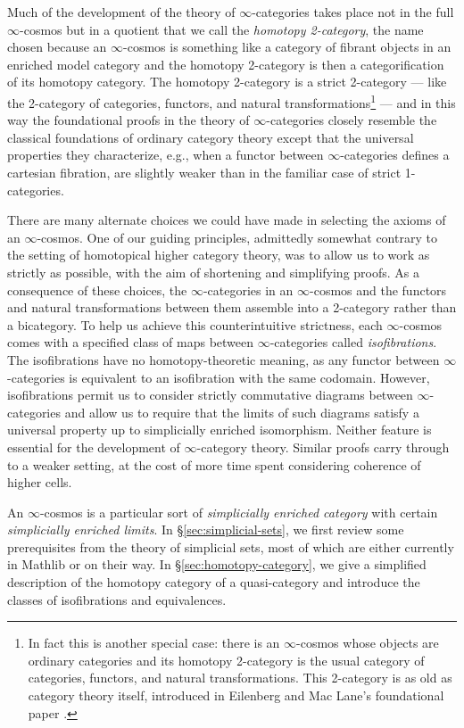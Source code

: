  Much of the development of the theory of $\infty$-categories takes place not in the full $\infty$-cosmos but in a quotient that we call the \emph{homotopy 2-category}, the name chosen because an $\infty$-cosmos is something like a category of fibrant objects in an enriched model category and the homotopy 2-category is then a categorification of its homotopy category. The homotopy 2-category is a strict 2-category --- like the 2-category of categories, functors, and natural transformations\footnote{In fact this is another special case: there is an \texorpdfstring{$\infty$}{infinity}-cosmos whose objects are ordinary categories and its homotopy 2-category is the usual category of categories, functors, and natural transformations. This 2-category is as old as category theory itself, introduced in Eilenberg and Mac Lane's foundational paper \cite{EilenbergMaclane:1945gt}.} --- and in this way the foundational proofs in the theory of $\infty$-categories closely resemble the classical foundations of ordinary category theory except that the universal properties they characterize, e.g., when a functor between $\infty$-categories defines a cartesian fibration, are slightly weaker than in the familiar case of strict 1-categories.

 There are many alternate choices we could have made in selecting the axioms of an $\infty$-cosmos. One of our guiding principles, admittedly somewhat contrary to the setting of homotopical higher category theory, was to allow us to work as strictly as possible, with the aim of shortening and simplifying proofs. As a consequence of these choices, the $\infty$-categories in an $\infty$-cosmos and the functors and natural transformations between them assemble into a 2-category rather than a bicategory. To help us achieve this counterintuitive strictness, each $\infty$-cosmos comes with a specified class of maps between $\infty$-categories called \emph{isofibrations}. The isofibrations have no homotopy-theoretic meaning, as any functor between $\infty$-categories is equivalent to an isofibration with the same codomain. However, isofibrations permit us to consider strictly commutative diagrams between $\infty$-cat\-e\-go\-ries and allow us to require that the limits of such diagrams satisfy a universal property up to simplicially enriched isomorphism. Neither feature is essential for the development of $\infty$-category theory. Similar proofs carry through to a weaker setting, at the cost of more time spent considering coherence of higher cells.

 An $\infty$-cosmos is a particular sort of \emph{simplicially enriched category} with certain \emph{simplicially enriched limits}. In \S\ref{sec:simplicial-sets}, we first review some prerequisites from the theory of simplicial sets, most of which are either currently in Mathlib or on their way. In \S\ref{sec:homotopy-category}, we give a simplified description of the homotopy category of a quasi-category and introduce the classes of isofibrations and equivalences.

